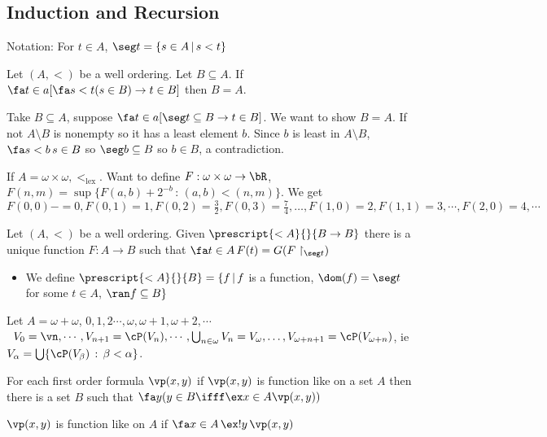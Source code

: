 
\subsection{Induction and Recursion} 

Notation: For $t \in A$, $\seg t = \{s \in A \, | \, s < t \}$ 

\begin{theorem}
    Let $(A, <)$ be a well ordering. Let $B \subseteq A$. If $\fa t \in a [\fa s < t(s \in B) \to t \in B]$ then $B = A$.
\end{theorem}

\begin{pf}
    Take $B \subseteq A$, suppose $\fa t \in a [\seg t \subseteq B \to t \in B]$. We want to show $B = A$. If not $A \setminus B$ is nonempty so it has a least element $b$. Since $b$ is least in $A \setminus B$, $\fa s < b \, s \in B$ so $\seg b \subseteq B$ so $b \in B$, a contradiction. 
\end{pf}

\begin{example}
    If $A = \omega \times \omega, <_{\text{lex}}$. Want to define $F: \omega \times \omega \to \bR$, $F(n,m) = \sup\{F(a,b) + 2^{-b} \, : \, (a,b) < (n,m)\}$. We get $F(0,0)-=0, F(0,1)=1, F(0,2) = \frac{3}{2}, F(0, 3) = \frac{7}{4}, \ldots, F(1,0)=2, F(1,1)=3, \cdots, F(2,0)=4, \cdots$ 
\end{example}

\begin{theorem}
    Let $(A, <)$ be a well ordering. Given $\prescript{<A}{}{B \to B}$ there is a unique function $F: A \to B$ such that $\fa t \in A \, F(t) = G(F\upharpoonright_{\seg t})$ 
\end{theorem}

\begin{itemize}
    \item We define $\prescript{<A}{}{B} = \{f \, | \, f$ is a function, $\dom(f) = \seg t$ for some $t \in A$, $\ran f \subseteq B\}$ 
\end{itemize}

\noindent
Let $A = \omega + \omega$, $0,1,2 \cdots, \omega, \omega + 1, \omega + 2, \cdots$ \\\
$V_0 = \vn, \cdots, V_{n+1} = \cP(V_n), \cdots, \bigcup_{n \in \omega}V_n = V_{\omega}, \ldots, V_{\omega + n + 1} = \cP(V_{\omega + n})$, ie $V_{\alpha} = \bigcup \{\cP(V_{\beta}) \, : \, \beta < \alpha\}$. 

\begin{axiom}
    For each first order formula $\vp(x,y)$ if $\vp(x,y)$ is function like on a set $A$ then there is a set $B$ such that $\fa y (y \in B \ifff \ex x \in A \vp(x,y))$ 
\end{axiom}

\begin{definition}
    $\vp(x,y)$ is function like on $A$ if $\fa x \in A \, \ex ! y \, \vp(x,y)$
\end{definition}